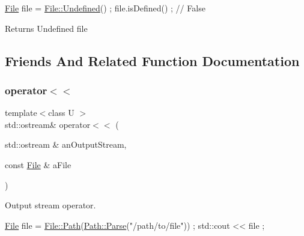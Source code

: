 \begin{DoxyCode}
\hyperlink{classlibrary_1_1core_1_1fs_1_1File_a7490060f19a21d4ee58bb6cec87a1ca6}{File} file = \hyperlink{classlibrary_1_1core_1_1fs_1_1File_a985adb1a33b94dcdbed2792651eb81af}{File::Undefined}() ;
file.isDefined() ; \textcolor{comment}{// False}
\end{DoxyCode}


\begin{DoxyReturn}{Returns}
Undefined file 
\end{DoxyReturn}


\subsection{Friends And Related Function Documentation}
\mbox{\label{classlibrary_1_1core_1_1fs_1_1File_aedbcccb29459f2d30d54a53b6850fbd2}} 
\subsubsection{\texorpdfstring{operator$<$$<$}{operator<<}}
{\footnotesize\ttfamily template$<$class U $>$ \\
std\+::ostream\& operator$<$$<$ (\begin{DoxyParamCaption}\item[{std\+::ostream \&}]{an\+Output\+Stream,  }\item[{const \hyperlink{classlibrary_1_1core_1_1fs_1_1File}{File} \&}]{a\+File }\end{DoxyParamCaption})\hspace{0.3cm}{\ttfamily [friend]}}



Output stream operator. 


\begin{DoxyCode}
\hyperlink{classlibrary_1_1core_1_1fs_1_1File_a7490060f19a21d4ee58bb6cec87a1ca6}{File} file = \hyperlink{classlibrary_1_1core_1_1fs_1_1File_a0e0d8a8becb3cdd21775554e181452d8}{File::Path}(\hyperlink{classlibrary_1_1core_1_1fs_1_1Path_aebf5bd3af83e0b7376616e146f3e55df}{Path::Parse}(\textcolor{stringliteral}{"/path/to/file"})) ;
std::cout << file ;
\end{DoxyCode}



